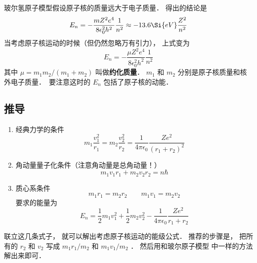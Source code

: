 
玻尔氢原子模型假设原子核的质量远大于电子质量． 得出的结论是
\begin{equation}
E_n = -\frac{mZ^2 e^4}{8\epsilon_0^2 h^2}\frac{1}{n^2} \approx  - 13.6\Si{eV} \frac{Z^2}{n^2}
\end{equation}
当考虑原子核运动的时候（但仍然忽略万有引力）， 上式变为
\begin{equation}
E_n = -\frac{\mu Z^2 e^4}{8\epsilon_0^2 h^2} \frac{1}{n^2}
\end{equation}
其中 $\mu  = m_1 m_2/(m_1 + m_2)$ 叫做\textbf{约化质量}． $m_1$ 和 $m_2$ 分别是原子核质量和核外电子质量．　要注意这时的 $E_n$ 包括了原子核的动能．
\subsection{推导}
\begin{enumerate}
\item 经典力学的条件
\begin{equation}
m_1 \frac{v_1^2}{r_1} = m_2 \frac{v_2^2}{r_2} = \frac{1}{4\pi\epsilon_0} \frac{Z e^2}{(r_1 + r_2)^2}
\end{equation}
\item 角动量量子化条件（注意角动量是总角动量！）
\begin{equation}
m_1 v_1 r_1 + m_2 v_2 r_2 = n\hbar 
\end{equation}
\item 质心系条件
\begin{equation}
m_1 r_1 = m_2 r_2 \qquad m_1 v_1 = m_2 v_2
\end{equation}
要求的能量为
\begin{equation}
E_n = \frac12 m_1 v_1^2 + \frac12 m_2 v_2^2 - \frac{1}{4\pi\epsilon_0} \frac{Z e^2}{r_1 + r_2}
\end{equation}
\end{enumerate}
联立这几条式子， 就可以解出考虑原子核运动的能级公式． 推荐的步骤是， 把所有的 $r_2$ 和 $v_2$ 写成 $m_1 r_1/m_2$ 和 $m_1 v_1/m_2$ ． 然后用和玻尔原子模型%
中一样的方法解出来即可．
